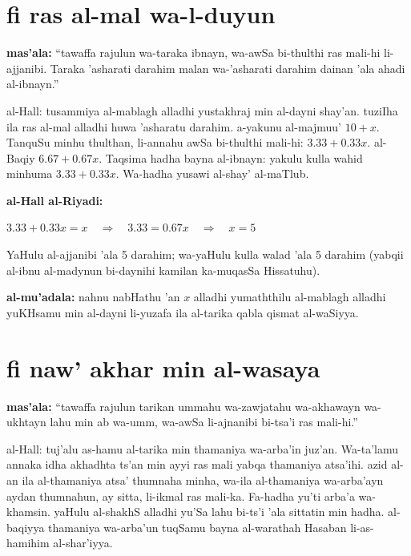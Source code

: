 \documentclass[11pt,a4paper]{book}
\begin{document}
\section*{fi ras al-mal wa-l-duyun}

\begin{originaltext}
\textbf{mas'ala:} ``tawaffa rajulun wa-taraka ibnayn, wa-awSa
bi-thulthi ras mali-hi li-ajjanibi. Taraka 'asharati darahim
malan wa-'asharati darahim dainan 'ala ahadi al-ibnayn.''

al-Hall: tusammiya al-mablagh alladhi yustakhraj min al-dayni
shay'an. tuziIha ila ras al-mal alladhi huwa 'asharatu darahim.
a-yakunu al-majmuu' $10 + x$. TanquSu minhu thulthan, li-annahu
awSa bi-thulthi mali-hi: $3.33 + 0.33x$. al-Baqiy $6.67 + 0.67x$.
Taqsima hadha bayna al-ibnayn: yakulu kulla wahid minhuma $3.33 +
0.33x$. Wa-hadha yusawi al-shay' al-maTlub.
\end{originaltext}

\begin{mathexplain}
\textbf{al-Hall al-Riyadi:}

\begin{center}
$3.33 + 0.33x = x \quad\Rightarrow\quad 3.33 = 0.67x \quad\Rightarrow\quad x = 5$
\end{center}

YaHulu al-ajjanibi 'ala 5 darahim; wa-yaHulu kulla walad 'ala 5
darahim (yabqii al-ibnu al-madynun bi-daynihi kamilan ka-muqasSa
Hissatuhu).

\textbf{al-mu'adala:} nahnu nabHathu 'an $x$ alladhi yumaththilu
al-mablagh alladhi yuKHsamu min al-dayni li-yuzafa ila al-tarika
qabla qismat al-waSiyya.
\end{mathexplain}

\section*{fi naw' akhar min al-wasaya}

\begin{originaltext}
\textbf{mas'ala:} ``tawaffa rajulun tarikan ummahu wa-zawjatahu
wa-akhawayn wa-ukhtayn lahu min ab wa-umm, wa-awSa li-ajnanibi
bi-tsa'i ras mali-hi.''

al-Hall: tuj'alu as-hamu al-tarika min thamaniya wa-arba'in juz'an.
Wa-ta'lamu annaka idha akhadhta ts'an min ayyi ras mali yabqa
thamaniya atsa'ihi. azid al-an ila al-thamaniya atsa' thumnaha minha,
wa-ila al-thamaniya wa-arba'ayn aydan thumnahun, ay sitta, li-ikmal
ras mali-ka. Fa-hadha yu'ti arba'a wa-khamsin. yaHulu al-shakhS
alladhi yu'Sa lahu bi-ts'i 'ala sittatin min hadha. al-baqiyya
thamaniya wa-arba'un tuqSamu bayna al-warathah Hasaban li-as-hamihim
al-shar'iyya.
\end{originaltext}
\end{document}
